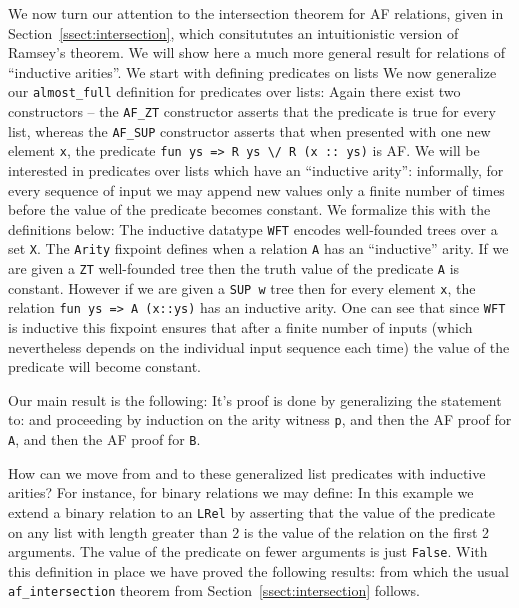 \documentclass{llncs}
\begin{document}
We now turn our attention to the intersection theorem for AF relations, given in 
Section~\ref{ssect:intersection}, which consitututes an intuitionistic version of Ramsey's theorem. We will show here
a much more general result for relations of ``inductive arities''. We start with defining predicates on lists
We now generalize our \lstinline|almost_full| definition for predicates over lists:
Again there exist two constructors -- the \lstinline|AF_ZT| constructor asserts that the predicate is true for every 
list, whereas the \lstinline|AF_SUP| constructor asserts that when presented with one new element \lstinline|x|, the
predicate \lstinline|fun ys => R ys \/ R (x :: ys)| is AF.
We will be interested in predicates over lists which have an ``inductive arity'': informally, for every sequence of input we
may append new values only a finite number of times before the value of the predicate becomes constant. We formalize
this with the definitions below:
The inductive datatype \lstinline|WFT| encodes well-founded trees over a set \lstinline|X|. The \lstinline|Arity| fixpoint
defines when a relation \lstinline|A| has an ``inductive'' arity.  If we are given a \lstinline|ZT| well-founded tree then the 
truth value of the predicate \lstinline|A| is 
constant. However if we are given a \lstinline|SUP w| tree then for every element \lstinline|x|, the relation 
\lstinline|fun ys => A (x::ys)| has an inductive arity. One can see that since \lstinline|WFT| is inductive this fixpoint ensures
that after a finite number of inputs (which nevertheless depends on the individual input sequence each time) the value of
the predicate will become constant. 

Our main result is the following:
It's proof is done by generalizing the statement to:
and proceeding by induction on the arity witness \lstinline|p|, and then the AF proof for \lstinline|A|, and then the 
AF proof for \lstinline|B|. 

How can we move from and to these generalized list predicates with inductive arities? For instance, for binary relations
we may define: 
In this example we extend a binary relation to an \lstinline|LRel| by asserting that the value of the predicate on any list
with length greater than 2 is the value of the relation on the first 2 arguments. The value of the predicate on fewer arguments
is just \lstinline|False|. With this definition in place we have proved the following results:
from which the usual \lstinline|af_intersection| theorem from Section~\ref{ssect:intersection} follows.
\end{document}
